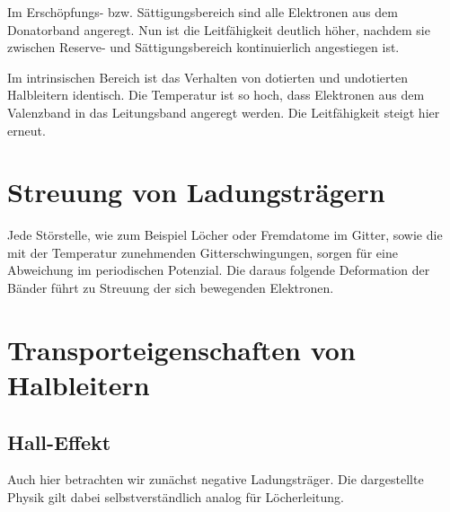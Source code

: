 Im Erschöpfungs- bzw. Sättigungsbereich sind alle Elektronen aus dem
Donatorband angeregt. Nun ist die Leitfähigkeit deutlich höher, nachdem sie
zwischen Reserve- und Sättigungsbereich kontinuierlich angestiegen ist.

Im intrinsischen Bereich ist das Verhalten von dotierten und undotierten
Halbleitern identisch. Die Temperatur ist so hoch, dass Elektronen aus dem
Valenzband in das Leitungsband angeregt werden. Die Leitfähigkeit steigt hier
erneut.

\section{Streuung von Ladungsträgern}

Jede Störstelle, wie zum Beispiel Löcher oder Fremdatome im Gitter, sowie die
mit der Temperatur zunehmenden Gitterschwingungen, sorgen für
eine Abweichung im periodischen Potenzial. Die daraus folgende Deformation der
Bänder führt zu Streuung der sich bewegenden Elektronen.

\section{Transporteigenschaften von Halbleitern}

\subsection{Hall-Effekt}

Auch hier betrachten wir zunächst negative Ladungsträger. Die dargestellte
Physik gilt dabei selbstverständlich analog für Löcherleitung.

